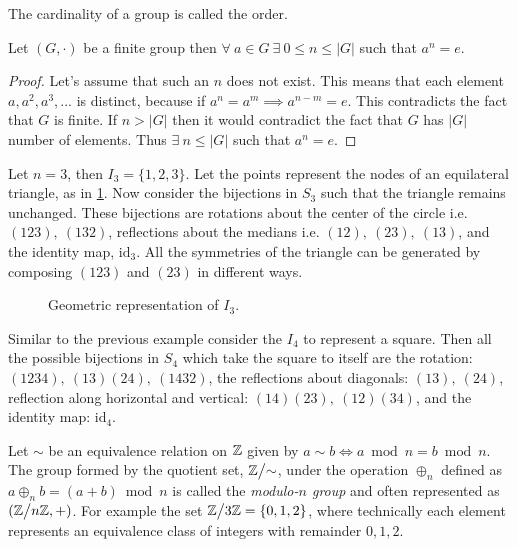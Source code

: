 \begin{definition}
  The cardinality of a group is called the order. 
\end{definition}
\begin{proposition}\label{prop:fingrp}
  Let $(G,\cdot)$ be a finite group then $\forall\ a\in G\ \exists\ 0 \leq n\leq |G|$ such that $a^n = e$.
\end{proposition}
\begin{proof}
  Let's assume that such an $n$ does not exist. This means that each element $a, a^2, a^3,...$ is distinct, because if $a^n = a^m \implies a^{n-m} = e$. This contradicts the fact that $G$ is finite. If $n>|G|$ then it would contradict the fact that $G$ has $|G|$ number of elements. Thus $\exists\ n \leq |G|$ such that $a^n = e$.
\end{proof}
\begin{example}
  Let $n=3$, then $I_3 = \{1,2,3\}$. Let the points represent the nodes of an equilateral triangle, as in \cref{fig:triangle}. Now consider the bijections in $S_3$ such that the triangle remains unchanged. These bijections are rotations about the center of the circle i.e. $(123),\ (132)$, reflections about the medians i.e. $(12),\ (23),\ (13)$, and the identity map, $\text{id}_3$. All the symmetries of the triangle can be generated by composing $(123)$ and $(23)$ in different ways.
\end{example}
\begin{figure}[ht]
    \centering
    \caption{Geometric representation of $I_3$.}
    \label{fig:triangle}
\end{figure}
\begin{example}
  Similar to the previous example consider the $I_4$ to represent a square. Then all the possible bijections in $S_4$ which take the square to itself are the rotation: $(1234),\ (13)(24),\ (1432)$, the reflections about diagonals: $(13),\ (24)$, reflection along horizontal and vertical: $(14)(23),\ (12)(34)$, and the identity map: $\text{id}_4$. 
\end{example}
\begin{example}
  Let $\sim$ be an equivalence relation on $\mathbb{Z}$ given by $a \sim b \iff a\bmod n = b\bmod n$. The group formed by the quotient set, $\Z\bign/\sim$, under the operation $\oplus_n$ defined as $a\oplus_n b = (a+b)\bmod n$ is called the \textit{modulo-$n$ group} and often represented as $(\Z\bign/n\Z, +)$. For example the set $\Z\bign/3\Z = \{0,1,2\}$, where technically each element represents an equivalence class of integers with remainder $0,1,2$. 
\end{example}

